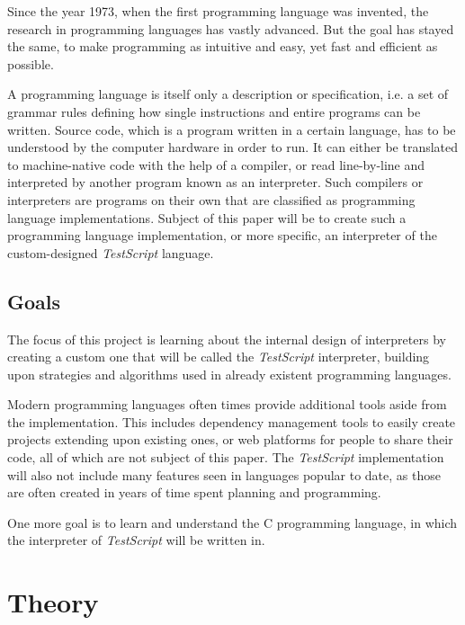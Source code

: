 \documentclass[12pt,a4paper]{article}
\newcommand{\name}{\emph{TestScript}}
\begin{document}
Since the year 1973, when the first programming language was invented, the
research in programming languages has vastly advanced. But the goal has stayed
the same, to make programming as intuitive and easy, yet fast and efficient as
possible.

A programming language is itself only a description or specification, i.e. a
set of grammar rules defining how single instructions and entire programs
can be written. Source code, which is a program written in a certain language,
has to be understood by the computer hardware in order to run. It can either
be translated to machine-native code with the help of a compiler, or
read line-by-line and interpreted by another program known as an interpreter.
Such compilers or interpreters are programs on their own that are classified
as programming language implementations. Subject of this paper will be to
create such a programming language implementation, or more specific, an interpreter
of the custom-designed \name{} language.

\subsection{Goals}
The focus of this project is learning about the internal design of interpreters
by creating a custom one that will be called the \name{} interpreter, building upon
strategies and algorithms used in already existent programming languages.

Modern programming languages often times provide additional tools aside from
the implementation. This includes dependency management tools to
easily create projects extending upon existing ones, or web platforms for
people to share their code, all of which are not subject of this paper.
The \name{} implementation will also not include many features seen in 
languages popular to date, as those are often created in years of time spent planning and
programming.

One more goal is to learn and understand the C programming language, in which
the interpreter of \name{} will be written in.

\section{Theory}
\end{document}
